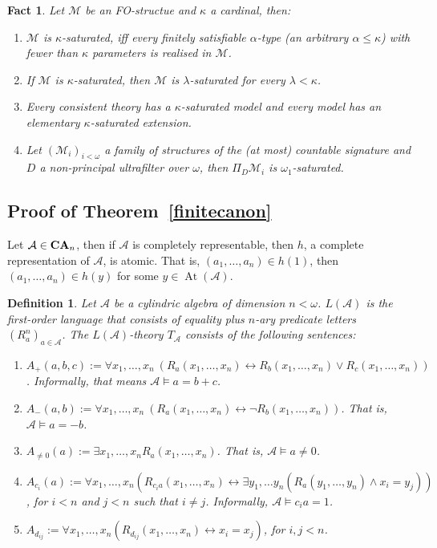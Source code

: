 \documentclass{article}
\theoremstyle{defin}
\newtheorem{definition}{Definition}
\theoremstyle{theorem}
\theoremstyle{claim}
\theoremstyle{prop}
\theoremstyle{lemma}
\theoremstyle{fact}
\newtheorem{fact}{Fact}
\theoremstyle{remark}
\theoremstyle{ex}
\theoremstyle{col}
\theoremstyle{question}
\begin{document}
\begin{fact} Let $\mathcal{M}$ be an FO-structue and $\kappa$ a cardinal, then:
\begin{enumerate}
\item $\mathcal{M}$ is $\kappa$-saturated, iff every finitely satisfiable $\alpha$-type (an arbitrary $\alpha \leq \kappa$) with fewer than $\kappa$ parameters is realised in  $\mathcal{M}$.
\item If $\mathcal{M}$ is $\kappa$-saturated, then $\mathcal{M}$ is $\lambda$-saturated for every $\lambda < \kappa$.
\item \label{saturation} Every consistent theory has a $\kappa$-saturated model and every model has an elementary $\kappa$-saturated extension.
\item Let $(\mathcal{M}_i)_{i < \omega}$ a family of structures of the (at most) countable signature and $D$ a non-principal ultrafilter over $\omega$, then $\Pi_D \mathcal{M}_i$ is $\omega_1$-saturated.
\end{enumerate}
\end{fact}

\subsection{Proof of Theorem~\ref{finitecanon}}

Let $\mathcal{A} \in {\bf CA}_n$, then if $\mathcal{A}$ is completely representable, then $h$, a complete representation of $\mathcal{A}$, is atomic. That is, $(a_1, \dots, a_n) \in h(1)$, then $(a_1, \dots, a_n) \in h(y)$ for some $y \in \operatorname{At}(\mathcal{A})$.

\begin{definition} \label{theory} Let $\mathcal{A}$ be a cylindric algebra of dimension $n < \omega$.
$L(\mathcal{A})$ is the first-order language that consists of equality plus $n$-ary predicate letters $(R^n_a)_{a \in \mathcal{A}}$. The $L(\mathcal{A})$-theory $T_{\mathcal{A}}$ consists of the following sentences:
\begin{enumerate}
\item $A_+(a,b,c) := \forall x_1, \dots, x_n \: (R_a(x_1, \dots, x_n) \leftrightarrow R_b(x_1, \dots, x_n) \lor R_c(x_1, \dots, x_n))$. Informally, that means $\mathcal{A} \models a = b + c$.
\item $A_{-}(a,b) := \forall x_1, \dots, x_n \: (R_a(x_1, \dots, x_n) \leftrightarrow \neg R_b(x_1, \dots, x_n))$. That is, $\mathcal{A} \models a = - b$.
\item $A_{\neq 0}(a) := \exists x_1, \dots, x_n R_a(x_1, \dots, x_n)$. That is, $\mathcal{A} \models a \neq 0$.
\item $A_{c_i}(a) := \forall x_1, \dots, x_n (R_{c_i a}(x_1, \dots, x_n) \leftrightarrow \exists y_1, \dots y_n (R_a(y_1, \dots, y_n) \land x_i = y_j))$, for $i < n$ and $j < n$ such that $i \neq j$. Informally, $\mathcal{A} \models {c_i} a = 1$.
\item $A_{d_{ij}} := \forall x_1, \dots, x_n (R_{d_{ij}}(x_1, \dots, x_n) \leftrightarrow x_i = x_j)$, for $i, j < n$.
\end{enumerate}
\end{definition}
\end{document}
